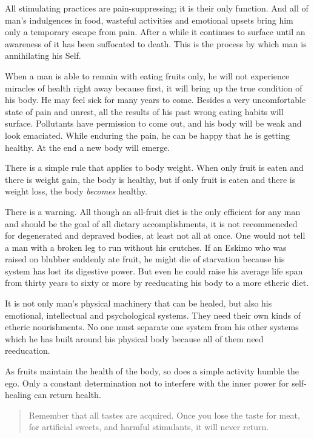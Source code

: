 \documentclass[12pt,letterpaper]{article}
\begin{document}
All stimulating practices are pain-suppressing; it is their only
function. And all of man's indulgences in food, wasteful activities
and emotional upsets bring him only a temporary escape from
pain. After a while it continues to surface until an awareness of it
has been suffocated to death. This is the process by which man is
annihilating his Self.

When a man is able to remain with eating fruits only, he will not
experience miracles of health right away because first, it will bring
up the true condition of his body. He may feel sick for many years to
come. Besides a very uncomfortable state of pain and unrest, all the
results of his past wrong eating habits will surface. Pollutants have
permission to come out, and his body will be weak and look
emaciated. While enduring the pain, he can be happy that he is getting
healthy. At the end a new body will emerge.

There is a simple rule that applies to body weight. When only fruit is
eaten and there is weight gain, the body is healthy, but if only fruit
is eaten and there is weight loss, the body \emph{becomes} healthy.

There is a warning. All though an all-fruit diet is the only efficient
for any man and should be the goal of all dietary accomplishments, it
is not recommeneded for degenerated and depraved bodies, at least not
all at once.  One would not tell a man with a broken leg to run
without his crutches. If an Eskimo who was raised on blubber suddenly
ate fruit, he might die of starvation because his system has lost its
digestive power. But even he could raise his average life span from
thirty years to sixty or more by reeducating his body to a more
etheric diet.

It is not only man's physical machinery that can be healed, but also
his emotional, intellectual and psychological systems. They need their
own kinds of etheric nourishments. No one must separate one system from
his other systems which he has built around his physical body because
all of them need reeducation.

As fruits maintain the health of the body, so does a simple activity
humble the ego. Only a constant determination not to interfere with
the inner power for self-healing can return health.

\begin{quotation} Remember that all tastes are acquired. Once you lose
the taste for meat, for artificial sweets, and harmful stimulants, it
will never return.
\end{quotation}
\end{document}
